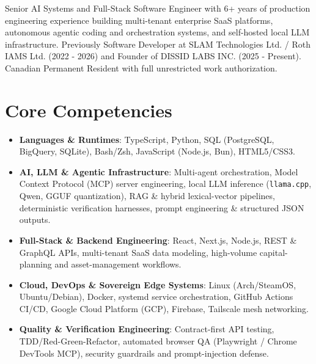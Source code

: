 \documentclass[11pt,a4paper,sans]{moderncv}
\begin{document}
\makecvtitle


\vspace{6pt}
\small{Senior AI Systems and Full-Stack Software Engineer with 6+ years of production engineering experience building multi-tenant enterprise SaaS platforms, autonomous agentic coding and orchestration systems, and self-hosted local LLM infrastructure. Previously Software Developer at SLAM Technologies Ltd. / Roth IAMS Ltd. (2022 - 2026) and Founder of DISSID LABS INC. (2025 - Present). Canadian Permanent Resident with full unrestricted work authorization.}


\section{Core Competencies}
\vspace{1pt}
\begin{itemize}

\item \textbf{Languages \& Runtimes}: TypeScript, Python, SQL (PostgreSQL, BigQuery, SQLite), Bash/Zsh, JavaScript (Node.js, Bun), HTML5/CSS3.

\item \textbf{AI, LLM \& Agentic Infrastructure}: Multi-agent orchestration, Model Context Protocol (MCP) server engineering, local LLM inference (\texttt{llama.cpp}, Qwen, GGUF quantization), RAG \& hybrid lexical-vector pipelines, deterministic verification harnesses, prompt engineering \& structured JSON outputs.

\item \textbf{Full-Stack \& Backend Engineering}: React, Next.js, Node.js, REST \& GraphQL APIs, multi-tenant SaaS data modeling, high-volume capital-planning and asset-management workflows.

\item \textbf{Cloud, DevOps \& Sovereign Edge Systems}: Linux (Arch/SteamOS, Ubuntu/Debian), Docker, systemd service orchestration, GitHub Actions CI/CD, Google Cloud Platform (GCP), Firebase, Tailscale mesh networking.

\item \textbf{Quality \& Verification Engineering}: Contract-first API testing, TDD/Red-Green-Refactor, automated browser QA (Playwright / Chrome DevTools MCP), security guardrails and prompt-injection defense.

\end{itemize}
\end{document}
